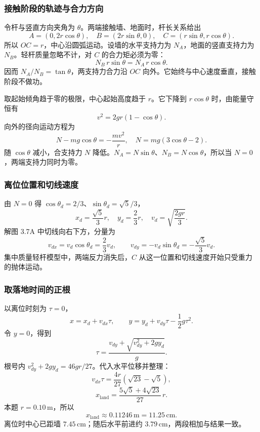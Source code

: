 \documentclass[UTF8,fontset=fandol,a4paper,11pt]{ctexart}
\begin{document}
\subsubsection*{接触阶段的轨迹与合力方向}
令杆与竖直方向夹角为 $\theta$。两端接触墙、地面时，杆长关系给出
\[
A=(0,2r\cos\theta),\quad B=(2r\sin\theta,0),\quad
C=(r\sin\theta,r\cos\theta).
\]
所以 $OC=r$，中心沿圆弧运动。设墙的水平支持力为 $N_A$，地面的竖直支持力为 $N_B$。轻杆质量忽略不计，对 $C$ 的合力矩必须为零：
\[
N_B\,r\sin\theta=N_A\,r\cos\theta.
\]
因而 $N_A/N_B=\tan\theta$，两支持力合力沿 $OC$ 向外。它始终与中心速度垂直，接触阶段不做功。

取起始倾角趋于零的极限，中心起始高度趋于 $r$。它下降到 $r\cos\theta$ 时，由能量守恒有
\[
v^2=2gr(1-\cos\theta).
\]
向外的径向运动方程为
\[
N-mg\cos\theta=-\frac{mv^2}{r},
\quad N=mg(3\cos\theta-2).
\]
随 $\cos\theta$ 减小，合支持力 $N$ 降低。$N_A=N\sin\theta$、$N_B=N\cos\theta$，所以当 $N=0$，两端支持力同时为零。

\subsubsection*{离位位置和切线速度}
由 $N=0$ 得 $\cos\theta_d=2/3$、$\sin\theta_d=\sqrt5/3$，
\[
x_d=\frac{\sqrt5}{3}r,\quad y_d=\frac23r,\quad
v_d=\sqrt{\frac{2gr}{3}}.
\]
解图 3.7A 中切线向右下方，分量为
\[
v_{dx}=v_d\cos\theta_d=\frac23v_d,\qquad
v_{dy}=-v_d\sin\theta_d=-\frac{\sqrt5}{3}v_d.
\]
集中质量轻杆模型中，两端反力消失后，$C$ 从这一位置和切线速度开始只受重力的抛体运动。

\subsubsection*{取落地时间的正根}
以离位时刻为 $\tau=0$，
\[
x=x_d+v_{dx}\tau,\qquad
y=y_d+v_{dy}\tau-\frac12g\tau^2.
\]
令 $y=0$，得到
\[
\tau=\frac{v_{dy}+\sqrt{v_{dy}^2+2gy_d}}{g}.
\]
根号内 $v_{dy}^2+2gy_d=46gr/27$。代入水平位移并整理：
\[
v_{dx}\tau
=\frac{4r}{27}(\sqrt{23}-\sqrt5),
\]
\[
\boxed{x_{\mathrm{land}}
=\frac{5\sqrt5+4\sqrt{23}}{27}\,r}.
\]
本题 $r=0.10\,\mathrm m$，所以
\[
\boxed{x_{\mathrm{land}}\approx0.11246\,\mathrm m=11.25\,\mathrm{cm}}.
\]
离位时中心已距墙 $7.45\,\mathrm{cm}$；随后水平前进约 $3.79\,\mathrm{cm}$，两段相加与结果一致。
\end{document}
